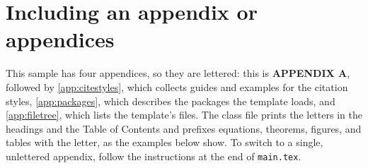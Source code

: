 
\chapter{Including an appendix or appendices}
\label{app:appendixA}



This sample has four appendices, so they are lettered: this is \textbf{APPENDIX A}, followed by \cref{app:citestyles}, which collects guides and examples for the citation styles, \cref{app:packages}, which describes the packages the template loads, and \cref{app:filetree}, which lists the template's files. The class file prints the letters in the headings and the Table of Contents and prefixes equations, theorems, figures, and tables with the letter, as the examples below show. To switch to a single, unlettered appendix, follow the instructions at the end of \texttt{main.tex}.


